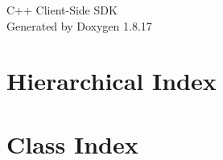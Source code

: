 \let\mypdfximage\pdfximage\def\pdfximage{\immediate\mypdfximage}\documentclass[twoside]{book}
\newcommand{\+}{\discretionary{\mbox{\scriptsize$\hookleftarrow$}}{}{}}
\newcommand{\clearemptydoublepage}{%
  \newpage{\pagestyle{empty}\cleardoublepage}%
}
\begin{document}
\hypersetup{pageanchor=false,
             bookmarksnumbered=true,
             pdfencoding=unicode
            }
\begin{titlepage}
\vspace*{7cm}
\begin{center}%
{\Large C++ Client-\/\+Side S\+DK }\\
\vspace*{1cm}
{\large Generated by Doxygen 1.8.17}\\
\end{center}
\end{titlepage}
\clearemptydoublepage
{}
\tableofcontents
\clearemptydoublepage
{}
\hypersetup{pageanchor=true}

\chapter{Hierarchical Index}

\chapter{Class Index}

\end{document}
